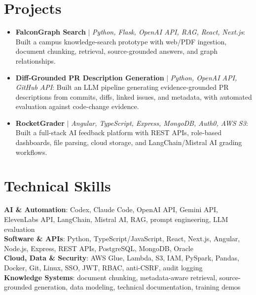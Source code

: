 \documentclass[letterpaper,11pt]{article}
\begin{document}
\section{Projects}
\begin{itemize}[leftmargin=0.15in, label={}, itemsep=1pt, topsep=1pt, parsep=0pt]
  \item\small{\textbf{FalconGraph Search} $|$ \emph{Python, Flask, OpenAI API, RAG, React, Next.js}: Built a campus knowledge-search prototype with web/PDF ingestion, document chunking, retrieval, source-grounded answers, and graph relationships.}
  \item\small{\textbf{Diff-Grounded PR Description Generation} $|$ \emph{Python, OpenAI API, GitHub API}: Built an LLM pipeline generating evidence-grounded PR descriptions from commits, diffs, linked issues, and metadata, with automated evaluation against code-change evidence.}
  \item\small{\textbf{RocketGrader} $|$ \emph{Angular, TypeScript, Express, MongoDB, Auth0, AWS S3}: Built a full-stack AI feedback platform with REST APIs, role-based dashboards, file parsing, cloud storage, and LangChain/Mistral AI grading workflows.}
\end{itemize}\vspace{-7pt}

\section{Technical Skills}
 \begin{itemize}[leftmargin=0.15in, label={}]
    \small{\item{
     \textbf{AI \& Automation}{: Codex, Claude Code, OpenAI API, Gemini API, ElevenLabs API, LangChain, Mistral AI, RAG, prompt engineering, LLM evaluation} \\
     \textbf{Software \& APIs}{: Python, TypeScript/JavaScript, React, Next.js, Angular, Node.js, Express, REST APIs, PostgreSQL, MongoDB, Oracle} \\
     \textbf{Cloud, Data \& Security}{: AWS Glue, Lambda, S3, IAM, PySpark, Pandas, Docker, Git, Linux, SSO, JWT, RBAC, anti-CSRF, audit logging} \\
     \textbf{Knowledge Systems}{: document chunking, metadata-aware retrieval, source-grounded generation, data modeling, technical documentation, training demos}
    }}
 \end{itemize}
\end{document}
